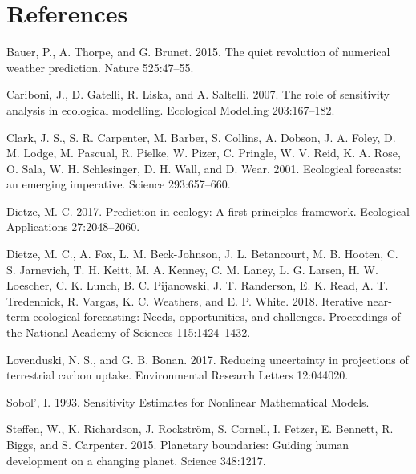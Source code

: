 \documentclass[12pt,]{article}
\begin{document}
\section*{References}\label{references}

\hypertarget{refs}{}
\hypertarget{ref-Bauer2015}{}
Bauer, P., A. Thorpe, and G. Brunet. 2015. The quiet revolution of
numerical weather prediction. Nature 525:47--55.

\hypertarget{ref-Cariboni2007}{}
Cariboni, J., D. Gatelli, R. Liska, and A. Saltelli. 2007. The role of
sensitivity analysis in ecological modelling. Ecological Modelling
203:167--182.

\hypertarget{ref-Clark2001}{}
Clark, J. S., S. R. Carpenter, M. Barber, S. Collins, A. Dobson, J. A.
Foley, D. M. Lodge, M. Pascual, R. Pielke, W. Pizer, C. Pringle, W. V.
Reid, K. A. Rose, O. Sala, W. H. Schlesinger, D. H. Wall, and D. Wear.
2001. Ecological forecasts: an emerging imperative. Science
293:657--660.

\hypertarget{ref-Dietze2017a}{}
Dietze, M. C. 2017. Prediction in ecology: A first-principles framework.
Ecological Applications 27:2048--2060.

\hypertarget{ref-Dietze2018}{}
Dietze, M. C., A. Fox, L. M. Beck-Johnson, J. L. Betancourt, M. B.
Hooten, C. S. Jarnevich, T. H. Keitt, M. A. Kenney, C. M. Laney, L. G.
Larsen, H. W. Loescher, C. K. Lunch, B. C. Pijanowski, J. T. Randerson,
E. K. Read, A. T. Tredennick, R. Vargas, K. C. Weathers, and E. P.
White. 2018. Iterative near-term ecological forecasting: Needs,
opportunities, and challenges. Proceedings of the National Academy of
Sciences 115:1424--1432.

\hypertarget{ref-Lovenduski2017}{}
Lovenduski, N. S., and G. B. Bonan. 2017. Reducing uncertainty in
projections of terrestrial carbon uptake. Environmental Research Letters
12:044020.

\hypertarget{ref-Sobol1993}{}
Sobol', I. 1993. Sensitivity Estimates for Nonlinear Mathematical
Models.

\hypertarget{ref-Steffen2015}{}
Steffen, W., K. Richardson, J. Rockström, S. Cornell, I. Fetzer, E.
Bennett, R. Biggs, and S. Carpenter. 2015. Planetary boundaries: Guiding
human development on a changing planet. Science 348:1217.
\end{document}
